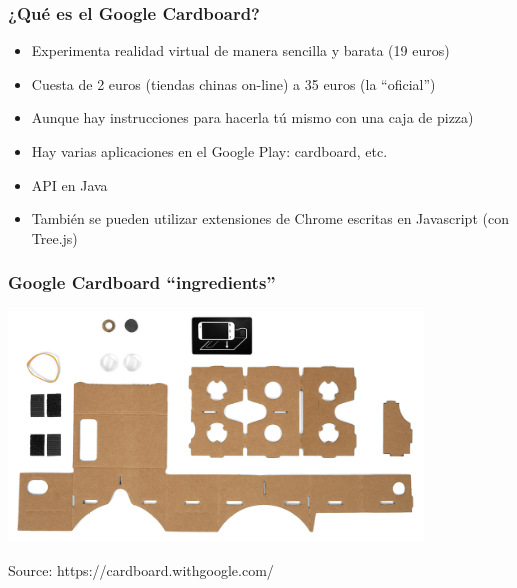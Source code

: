 
\begin{frame}
\frametitle{¿Qué es el Google Cardboard?}

\begin{itemize}
   \item Experimenta realidad virtual de manera sencilla y barata (19 euros)
   \item Cuesta de 2 euros (tiendas chinas on-line) a 35 euros (la ``oficial'')
   \item Aunque hay instrucciones para hacerla tú mismo con una caja de pizza)
   \item Hay varias aplicaciones en el Google Play: cardboard, etc.
   \item API en Java
   \item También se pueden utilizar extensiones de Chrome escritas en Javascript (con Tree.js)
\end{itemize}

\end{frame}



\begin{frame}
\frametitle{Google Cardboard ``ingredients''}

\begin{center}
  \includegraphics[width=11cm]{figs/ingredients.png}
\end{center}


\begin{flushright}
{\tiny
Source: https://cardboard.withgoogle.com/
}
\end{flushright}

\end{frame}


